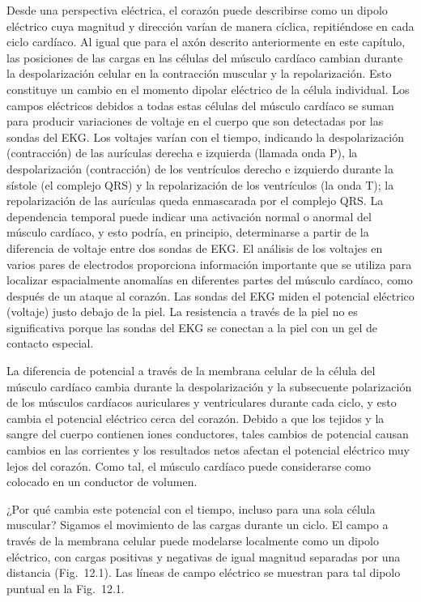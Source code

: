 \documentclass[12pt]{book}
\begin{document}
Desde una perspectiva eléctrica, el corazón puede describirse como un dipolo eléctrico cuya magnitud y dirección varían de manera cíclica, repitiéndose en cada ciclo cardíaco. Al igual que para el axón descrito anteriormente en este capítulo, las posiciones de las cargas en las células del músculo cardíaco cambian durante la despolarización celular en la contracción muscular y la repolarización. Esto constituye un cambio en el momento dipolar eléctrico de la célula individual. Los campos eléctricos debidos a todas estas células del músculo cardíaco se suman para producir variaciones de voltaje en el cuerpo que son detectadas por las sondas del EKG. Los voltajes varían con el tiempo, indicando la despolarización (contracción) de las aurículas derecha e izquierda (llamada onda P), la despolarización (contracción) de los ventrículos derecho e izquierdo durante la sístole (el complejo QRS) y la repolarización de los ventrículos (la onda T); la repolarización de las aurículas queda enmascarada por el complejo QRS. La dependencia temporal puede indicar una activación normal o anormal del músculo cardíaco, y esto podría, en principio, determinarse a partir de la diferencia de voltaje entre dos sondas de EKG. El análisis de los voltajes en varios pares de electrodos proporciona información importante que se utiliza para localizar espacialmente anomalías en diferentes partes del músculo cardíaco, como después de un ataque al corazón. Las sondas del EKG miden el potencial eléctrico (voltaje) justo debajo de la piel. La resistencia a través de la piel no es significativa porque las sondas del EKG se conectan a la piel con un gel de contacto especial.

La diferencia de potencial a través de la membrana celular de la célula del músculo cardíaco cambia durante la despolarización y la subsecuente polarización de los músculos cardíacos auriculares y ventriculares durante cada ciclo, y esto cambia el potencial eléctrico cerca del corazón. Debido a que los tejidos y la sangre del cuerpo contienen iones conductores, tales cambios de potencial causan cambios en las corrientes y los resultados netos afectan el potencial eléctrico muy lejos del corazón. Como tal, el músculo cardíaco puede considerarse como colocado en un conductor de volumen.

¿Por qué cambia este potencial con el tiempo, incluso para una sola célula muscular? Sigamos el movimiento de las cargas durante un ciclo. El campo a través de la membrana celular puede modelarse localmente como un dipolo eléctrico, con cargas positivas y negativas de igual magnitud separadas por una distancia (Fig.~12.1). Las líneas de campo eléctrico se muestran para tal dipolo puntual en la Fig.~12.1.
\end{document}
